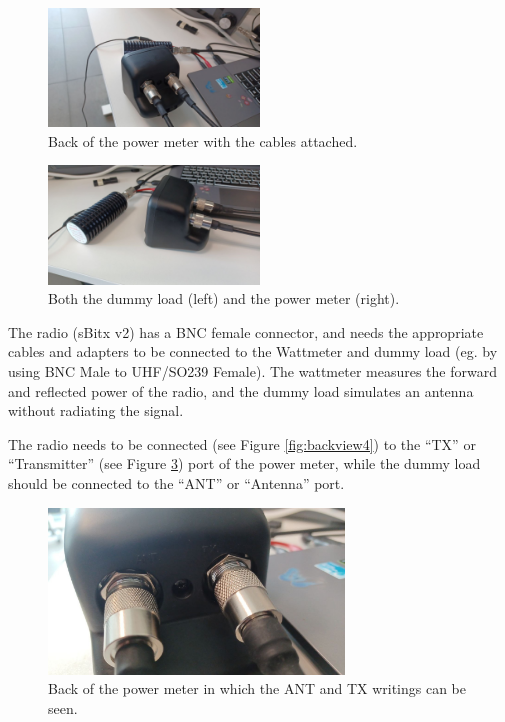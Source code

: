 \documentclass[11pt,a4paper]{article}
\begin{document}
\begin{figure}[H]
  \centering
  \includegraphics[width=0.5\textwidth]{pictures/wattmeter_1.jpeg}
  \caption{Back of the power meter with the cables attached.}
  \label{fig:backview1}
\end{figure}

\begin{figure}[H]
  \centering
  \includegraphics[width=0.5\textwidth]{pictures/wattmeter_3.jpeg}
  \caption{Both the dummy load (left) and the power meter (right).}
  \label{fig:backview3}
\end{figure}


The radio (sBitx v2) has a BNC female connector, and needs the appropriate cables and adapters to
be connected to the Wattmeter and dummy load (eg. by using BNC Male to UHF/SO239 Female). The wattmeter measures the forward and reflected power of the radio,
and the dummy load simulates an antenna without radiating the signal.

The radio needs to be connected (see Figure \ref{fig:backview4}) to the ``TX'' or ``Transmitter'' (see Figure \ref{fig:backview2}) port of the power meter, while the dummy load
should be connected to the ``ANT'' or ``Antenna'' port.

\begin{figure}[!ht]
  \centering
  \includegraphics[width=0.7\textwidth]{pictures/wattmeter_2.jpeg}
  \caption{Back of the power meter in which the ANT and TX writings can be seen.}
  \label{fig:backview2}
\end{figure}
\end{document}
